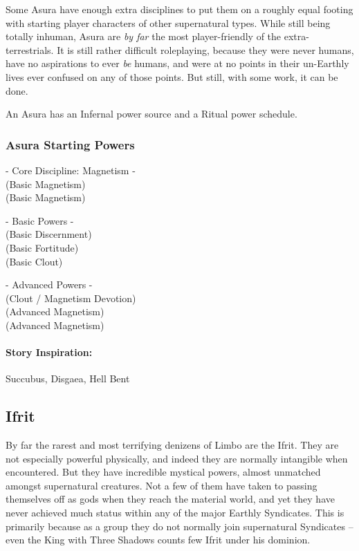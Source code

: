 Some Asura have enough extra disciplines to put them on a roughly equal footing with starting player characters of other supernatural types. While still being totally inhuman, Asura are \textit{by far} the most player-friendly of the extra-terrestrials. It is still rather difficult roleplaying, because they were never humans, have no aspirations to ever \textit{be} humans, and were at no points in their un-Earthly lives ever confused on any of those points. But still, with some work, it can be done.

An Asura has an Infernal power source and a Ritual power schedule.

\subsubsection{Asura Starting Powers}

\hspace{\parindent} - Core Discipline: Magnetism -\\
 (Basic Magnetism)\\
 (Basic Magnetism)

- Basic Powers -\\
 (Basic Discernment)\\
 (Basic Fortitude)\\
 (Basic Clout)

- Advanced Powers -\\
 (Clout / Magnetism Devotion)\\
 (Advanced Magnetism)\\
 (Advanced Magnetism)

\paragraph{Story Inspiration:} Succubus, Disgaea, Hell Bent

\subsection{Ifrit} 

By far the rarest and most terrifying denizens of Limbo are the Ifrit. They are not especially powerful physically, and indeed they are normally intangible when encountered. But they have incredible mystical powers, almost unmatched amongst supernatural creatures. Not a few of them have taken to passing themselves off as gods when they reach the material world, and yet they have never achieved much status within any of the major Earthly Syndicates. This is primarily because as a group they do not normally join supernatural Syndicates -- even the King with Three Shadows counts few Ifrit under his dominion. 

